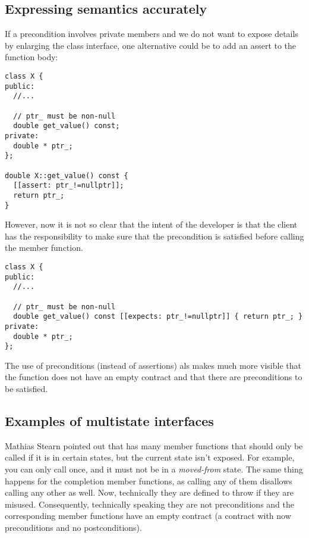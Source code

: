 \subsection{Expressing semantics accurately}

If a precondition involves private members and we do not want to expose details
by enlarging the class interface, one alternative could be to add an assert to
the function body:

\begin{lstlisting}
class X {
public:
  //...

  // ptr_ must be non-null
  double get_value() const;
private:
  double * ptr_;
};

double X::get_value() const {
  [[assert: ptr_!=nullptr]];
  return ptr_;
}
\end{lstlisting}

However, now it is not so clear that the intent of the developer is that the
client has the responsibility to make sure that the precondition is satisfied
before calling the member function.

\begin{lstlisting}
class X {
public:
  //...

  // ptr_ must be non-null
  double get_value() const [[expects: ptr_!=nullptr]] { return ptr_; }
private:
  double * ptr_;
};
\end{lstlisting}

The use of preconditions (instead of assertions) als makes much more visible
that the function does not have an empty contract and that there are
preconditions to be satisfied.

\subsection{Examples of multistate interfaces}

Mathias Stearn pointed out that
 has many member functions that should only be called if it
is in certain states, but the current state isn’t exposed. For example, you can
only call  once, and it must not be in a \emph{moved-from}
state. The same thing happens for the completion member functions, as calling any of
them disallows calling any other as well. Now, technically they are defined to
throw if they are misused. Consequently, technically speaking they are not
preconditions and the corresponding member functions have an empty contract (a
contract with now preconditions and no postconditions). 

